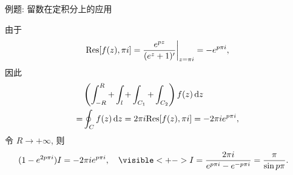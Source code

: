 \begin{frame}{例题: 留数在定积分上的应用}
\begin{solutionc}
\indent
由于
\[{\mathrm{Res}}[f(z),\pi i]
=\frac{e^{pz}}{(e^z+1)'}\bigg|_{z=\pi i}=-e^{p\pi i},\]
\onslide<+->
因此
\begin{align*}
&\left(\int_{-R}^R+\int_l+\int_{C_1}+\int_{C_2}\right)f(z)\,\mathrm{d} z\\
=&\oint_Cf(z)\,\mathrm{d} z=2\pi i{\mathrm{Res}}[f(z),\pi i]=-2\pi ie^{p\pi i},
\end{align*}
\onslide<+->
令 $R\to+\infty$,
\onslide<+->
则
\begin{align*}
&(1-e^{2p\pi i})I=-2\pi ie^{p\pi i},\quad
\visible<+->{I=\frac{2\pi i}{e^{p\pi i}-e^{-p\pi i}}=\frac{\pi}{\sin p\pi}.}
\end{align*}
\vspace{-\baselineskip}
\end{solutionc}
\end{frame}

